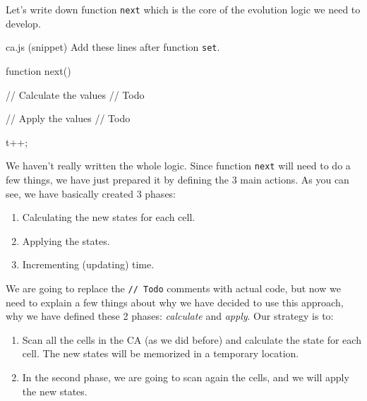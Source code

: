 Let's write down function \texttt{next} which is the core of the evolution logic we need to develop.

\begin{programcode}{ca.js (snippet)}
Add these lines after function \texttt{set}.
\begin{code}
function next() {
  // Calculate the values
  // Todo

  // Apply the values
  // Todo

  t++;
}
\end{code}
\end{programcode}

We haven't really written the whole logic. Since function \texttt{next} will need to do a few things, we
have just prepared it by defining the 3 main actions. As you can see, we have basically created 3 phases:

\begin{enumerate}
\item Calculating the new states for each cell.
\item Applying the states.
\item Incrementing (updating) time.
\end{enumerate}

We are going to replace the \texttt{// Todo} comments with actual code, but now we need to explain a few
things about why we have decided to use this approach, why we have defined these 2 phases: 
\textit{calculate} and \textit{apply}. Our strategy is to:

\begin{enumerate}
\item Scan all the cells in the CA (as we did before) and calculate the state for each cell.
The new states will be memorized in a temporary location.
\item In the second phase, we are going to scan again the cells, and we will apply the new states.
\end{enumerate}

%
\begin{marginfigure}[-6.5cm]
  
  \caption[Example of incremental CA]{An example of incremental CA. As you can see in iteration $t=k$, one cell is updated
  with its new state. In the next iteration ($t=k+1$), the next cell is updated, however its state
  will be calculated on the new value of the previous.}
  \label{fig:updatecainc}
\end{marginfigure}
%


